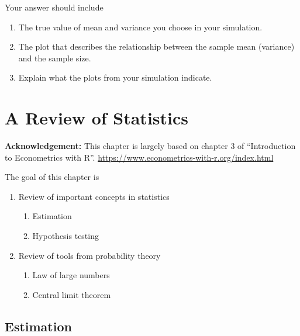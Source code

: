 \documentclass[]{book}
\providecommand{\tightlist}{%
  \setlength{\itemsep}{0pt}\setlength{\parskip}{0pt}}
\begin{document}
Your answer should include

\begin{enumerate}
\def\labelenumi{\arabic{enumi}.}
\tightlist
\item
  The true value of mean and variance you choose in your simulation.
\item
  The plot that describes the relationship between the sample mean (variance) and the sample size.
\item
  Explain what the plots from your simulation indicate.
\end{enumerate}

\hypertarget{a-review-of-statistics}{%
\chapter{A Review of Statistics}\label{a-review-of-statistics}}

\textbf{Acknowledgement:} This chapter is largely based on chapter 3 of ``Introduction to Econometrics with R''. \url{https://www.econometrics-with-r.org/index.html}

The goal of this chapter is

\begin{enumerate}
\def\labelenumi{\arabic{enumi}.}
\tightlist
\item
  Review of important concepts in statistics

  \begin{enumerate}
  \def\labelenumii{\arabic{enumii}.}
  \tightlist
  \item
    Estimation
  \item
    Hypothesis testing
  \end{enumerate}
\item
  Review of tools from probability theory

  \begin{enumerate}
  \def\labelenumii{\arabic{enumii}.}
  \tightlist
  \item
    Law of large numbers
  \item
    Central limit theorem
  \end{enumerate}
\end{enumerate}

\hypertarget{estimation}{%
\section{Estimation}\label{estimation}}
\end{document}
